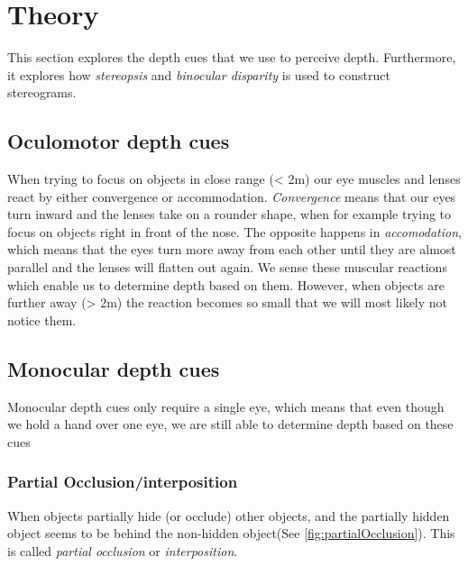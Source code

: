 \section{Theory}
This section explores the depth cues that we use to perceive depth. Furthermore, it explores how \textit{stereopsis} and \textit{binocular disparity} is used to construct stereograms.

\subsection{Oculomotor depth cues}
When trying to focus on objects in close range (< 2m) our eye muscles and lenses react by either convergence or accommodation. \textit{Convergence} means that our eyes turn inward and the lenses take on a rounder shape, when for example trying to focus on objects right in front of the nose. The opposite happens in \textit{accomodation}, which means that the eyes turn more away from each other until they are almost parallel and the lenses will flatten out again. We sense these muscular reactions which enable us to determine depth based on them. However, when objects are further away (> 2m) the reaction becomes so small that we will most likely not notice them\citep[p.~196]{sensationPerception}.

\subsection{Monocular depth cues}
Monocular depth cues only require a single eye, which means that even though we hold a hand over one eye, we are still able to determine depth based on these cues\citep[p.~197]{sensationPerception}

\subsubsection{Partial Occlusion/interposition}
When objects partially hide (or occlude) other objects, and the partially hidden object seems to be behind the non-hidden object(See \autoref{fig:partialOcclusion}). This is called \textit{partial occlusion} or \textit{interposition}\citep[p.~197]{sensationPerception}.

